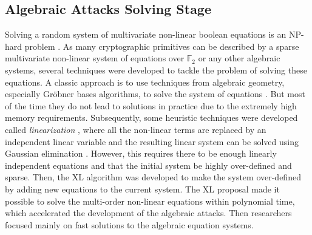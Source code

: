 \subsection{Algebraic Attacks Solving Stage}
Solving a random system of multivariate non-linear boolean equations is an NP-hard problem \cite{fraenkel1980complexity}. As many cryptographic primitives can be described by a sparse multivariate non-linear system of equations over $\mathbb{F}_2$ or any other algebraic systems, several techniques were developed to tackle the problem of solving these equations. A classic approach is to use techniques from algebraic geometry, especially Gr\"{o}bner bases algorithms, to solve the system of equations \cite{faugere1999new}. But most of the time they do not lead to solutions in practice due to the extremely high memory requirements. Subsequently, some heuristic techniques were developed called \textit{linearization} \cite{XL}, where all the non-linear terms are replaced by an independent linear variable and the resulting linear system can be solved using Gaussian elimination \cite{sepehrdad2012statistical}. However, this requires there to be enough linearly independent equations and that the initial system  be highly over-defined and sparse. Then, the XL algorithm \cite{XL,courtois2002cryptanalysis} was developed to make the system over-defined by adding new equations to the current system. The XL proposal made it possible to solve the multi-order non-linear equations within polynomial time, which accelerated the development of the algebraic attacks. Then researchers focused mainly on  fast solutions to the algebraic equation systems. 

